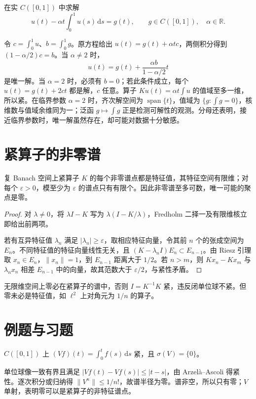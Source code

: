\documentclass[UTF8,12pt,a4paper,fontset=fandol]{ctexbook}
\begin{document}
\begin{example}\label{ex:fa-rank-one-fredholm}
在实 $C([0,1])$ 中求解
\[
 u(t)-\alpha t\int_0^1u(s)\,\mathrm ds=g(t),
 \qquad g\in C([0,1]),\quad\alpha\in\mathbb R.
\]
\end{example}
\begin{solve}
令 $c=\int_0^1u$、$b=\int_0^1g$。原方程给出 $u(t)=g(t)+\alpha tc$，两侧积分得到 $(1-\alpha/2)c=b$。当 $\alpha\ne2$ 时，
\[
 u(t)=g(t)+\frac{\alpha b}{1-\alpha/2}t
\]
是唯一解。当 $\alpha=2$ 时，必须有 $b=0$；若此条件成立，每个 $u(t)=g(t)+2ct$ 都是解，$c$ 任意。算子 $Ku(t)=\alpha t\int u$ 的值域至多一维，所以紧。在临界参数 $\alpha=2$ 时，齐次解空间为 $\operatorname{span}\{t\}$，值域为 $\{g:\int g=0\}$，核维数与值域余维同为一；泛函 $g\mapsto\int g$ 正是检测可解性的观测。分母还表明，接近临界参数时，唯一解虽然存在，却可能对数据十分敏感。
\end{solve}

\section{紧算子的非零谱}
\begin{theorem}\label{thm:fa-compact-spectrum}
复 Banach 空间上紧算子 $K$ 的每个非零谱点都是特征值，其特征空间有限维；对每个 $\varepsilon>0$，模至少为 $\varepsilon$ 的谱点只有有限个。因此非零谱至多可数，唯一可能的聚点是零。
\end{theorem}
\begin{proof}
对 $\lambda\ne0$，将 $\lambda I-K$ 写为 $\lambda(I-K/\lambda)$，Fredholm 二择一及有限维核立即给出前两项。

若有互异特征值 $\lambda_n$ 满足 $|\lambda_n|\geq\varepsilon$，取相应特征向量，令其前 $n$ 个的张成空间为 $E_n$。不同特征值的特征向量线性无关，且 $(K-\lambda_n I)E_n\subset E_{n-1}$。由 Riesz 引理取 $x_n\in E_n$，$\|x_n\|=1$，到 $E_{n-1}$ 距离大于 $1/2$。若 $n>m$，则 $Kx_n-Kx_m$ 与 $\lambda_nx_n$ 相差 $E_{n-1}$ 中的向量，故其范数大于 $\varepsilon/2$，与紧性矛盾。
\end{proof}
无限维空间上零必在紧算子的谱中，否则 $I=K^{-1}K$ 紧，违反闭单位球不紧。但零未必是特征值，如 $\ell^2$ 上对角元为 $1/n$ 的算子。

\section{例题与习题}
\begin{example}[Volterra 算子]
$C([0,1])$ 上 $(Vf)(t)=\int_0^t f(s)\,\mathrm ds$ 紧，且 $\sigma(V)=\{0\}$。
\end{example}
\begin{solve}
单位球像一致有界且满足 $|Vf(t)-Vf(s)|\leq|t-s|$，由 Arzelà--Ascoli 得紧性。逐次积分或归纳得 $\|V^n\|\leq1/n!$，故谱半径为零。谱非空，所以只有零；$V$ 单射，表明零可以是紧算子的非特征谱点。
\end{solve}
\end{document}
